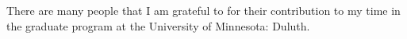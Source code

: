 There are many people that I am grateful to for their contribution to my time in the graduate program at the University of Minnesota: Duluth. 